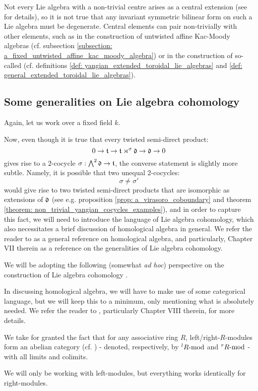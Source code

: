 \begin{remark}
            Not every Lie algebra with a non-trivial centre arises as a central extension (see \cite[Section 1]{garland_arithmetics_of_loop_groups} for details), so it is not true that any invariant symmetric bilinear form on such a Lie algebra must be degenerate. Central elements can pair non-trivially with other elements, such as in the construction of untwisted affine Kac-Moody algebras (cf. subsection \ref{subsection: a_fixed_untwisted_affine_kac_moody_algebra}) or in the construction of so-called  (cf. definitions \ref{def: yangian_extended_toroidal_lie_algebras} and \ref{def: general_extended_toroidal_lie_algebras}).
        \end{remark}

    \subsection{Some generalities on Lie algebra cohomology}
        Again, let us work over a fixed field $k$.
    
        Now, even though it is true that every twisted semi-direct product:
            $$0 \to \t \to \t \rtimes^{\sigma} \d \to \d \to 0$$
        gives rise to a $2$-cocycle $\sigma: \bigwedge^2 \d \to \t$, the converse statement is slightly more subtle. Namely, it is possible that two unequal $2$-cocycles:
            $$\sigma \not = \sigma'$$
        would give rise to two twisted semi-direct products that are isomorphic as extensions of $\d$ (see e.g. proposition \ref{prop: a_virasoro_coboundary} and theorem \ref{theorem: non_trivial_yangian_cocycles_examples}), and in order to capture this fact, we will need to introduce the language of Lie algebra cohomology, which also necessitates a brief discussion of homological algebra in general. We refer the reader to \cite{hilton_stammbach_homological_algebra} as a general reference on homological algebra, and particularly, Chapter VII therein as a reference on the generalities of Lie algebra cohomology. 

        We will be adopting the following (somewhat \textit{ad hoc}) perspective on the construction of Lie algebra cohomology .
        \begin{convention}
            In discussing homological algebra, we will have to make use of some categorical language, but we will keep this to a minimum, only mentioning what is absolutely needed. We refer the reader to \cite{maclane}, particularly Chapter VIII therein, for more details.
        \end{convention}
        \begin{convention}
            We take for granted the fact that for any associative ring $R$, left/right-$R$-modules form an abelian category (cf. \cite[Section VIII.3, p. 198]{maclane}) - denoted, respectively, by ${}^lR\mod$ and ${}^rR\mod$ - with all limits and colimits.

            We will only be working with left-modules, but everything works identically for right-modules.
        \end{convention}

